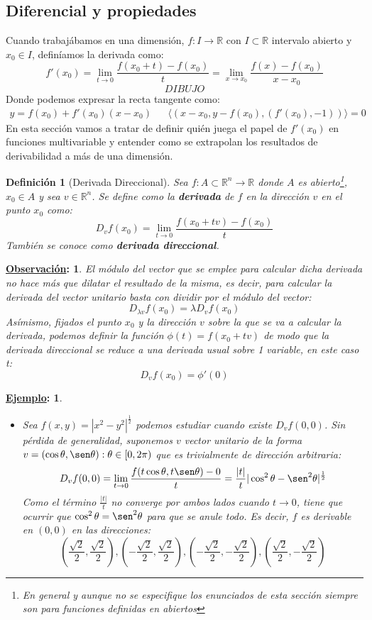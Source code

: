 \documentclass[10pt,a4paper,openright]{book}
\theoremstyle{break}
\newtheorem*{defi}{Definición}
\newtheorem*{obs}{\underline{Observación}:}
\newtheorem*{ej}{\underline{Ejemplo}:}
\begin{document}
\subsection{Diferencial y propiedades}
Cuando trabajábamos en una dimensión, $f: I \to \mathbb{R}$ con $I \subset \mathbb{R}$ intervalo abierto y $x_0 \in I$, definíamos la derivada como: 
$$f'(x_0)= \lim_{t \to 0} \frac{f(x_0 + t) - f(x_0) }{t} = \lim_{x \to x_0} \frac{f(x) - f(x_0)}{x - x_0}$$
$$DIBUJO$$
Donde podemos expresar la recta tangente como:
\begin{align*}
y= f(x_0) + f'(x_0)(x - x_0) & & \langle (x-x_0, y - f(x_0), (f'(x_0), - 1)) \rangle = 0 
\end{align*}
En esta sección vamos a tratar de definir quién juega el papel de $f'(x_0)$ en funciones multivariable y entender como se extrapolan los resultados de derivabilidad a más de una dimensión.

\begin{defi}[Derivada Direccional]
Sea $f:A \subset \mathbb{R}^n \to \mathbb{R}$ donde $A$ es abierto\footnote{En general y aunque no se especifique los enunciados de esta sección siempre son para funciones definidas en abiertos}, $x_0 \in A$ y sea $v \in \mathbb{R}^n$. Se define como la \textbf{derivada} de $f$ en la dirección $v$ en el punto $x_0$ como:
$$D_v f(x_0) = \lim_{t \to 0} \frac{f(x_0 + tv) - f(x_0)}{t}$$
También se conoce como \textbf{derivada direccional}.
\end{defi}

\begin{obs}
El módulo del vector que se emplee para calcular dicha derivada no hace más que dilatar el resultado de la misma, es decir, para calcular la derivada del vector unitario basta con dividir por el módulo del vector:
$$D_{\lambda v} f(x_0) = \lambda D_v f(x_0)$$
Asímismo, fijados el punto $x_0$ y la dirección $v$ sobre la que se va a calcular la derivada, podemos definir la función $\phi(t) = f(x_0 + tv)$ de modo que la derivada direccional se reduce a una derivada usual sobre 1 variable, en este caso t:
$$D_v f(x_0) = \phi'(0)$$
\end{obs}

\begin{ej}
\begin{itemize}
\item Sea $f(x,y) = |x^2 - y^2|^{\frac{1}{2}}$ podemos estudiar cuando existe $D_v f(0,0)$. Sin pérdida de generalidad, suponemos $v$ vector unitario de la forma $v = (\cos \theta, \sen \theta) : \theta \in [0,2\pi)$ que es trivialmente de dirección arbitraria:
$$D_vf(0,0) = \lim_{t\rightarrow 0} \frac{f(t\cos\theta , t \sen \theta) - 0}{t} = \frac{|t|}{t} |\cos^2\theta - \sen^2\theta|^\frac{1}{2}$$
Como el término $\frac{|t|}{t}$ no converge por ambos lados cuando $t\rightarrow 0$, tiene que ocurrir que $\cos^2\theta = \sen^2\theta$ para que se anule todo. Es decir, $f$ es derivable en $(0,0)$ en las direcciones:
$$\left( \frac{\sqrt{2}}{2},\frac{\sqrt{2}}{2} \right), \left( -\frac{\sqrt{2}}{2},\frac{\sqrt{2}}{2} \right),\left( -\frac{\sqrt{2}}{2},-\frac{\sqrt{2}}{2} \right),\left( \frac{\sqrt{2}}{2},-\frac{\sqrt{2}}{2} \right)  $$
\end{itemize}
\end{ej}
\end{document}
